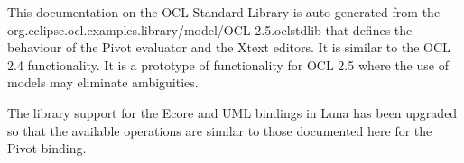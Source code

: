\documentclass{scrreprt}   %
\begin{document}

\label{ocl:AbstractSyntax}


\label{ocl:ConcreteSyntax}
\label{ocl:BaseOCLConcreteSyntax}

\label{ocl:EssentialOCLConcreteSyntax}

\label{ocl:CompleteOCLConcreteSyntax}


\label{ocl:EvaluationSemantics}
%

This documentation on the OCL Standard Library is auto-generated from the
org.eclipse.ocl.examples.library/model/OCL-2.5.oclstdlib that defines
the behaviour of the Pivot evaluator and the Xtext editors. It is similar to the OCL 2.4 functionality.
It is a prototype of functionality for OCL 2.5 where the use of models may eliminate ambiguities.
		
The library support for the Ecore and UML bindings in Luna has been upgraded so that the available operations
are similar to those documented here for the Pivot binding.





\end{document}

